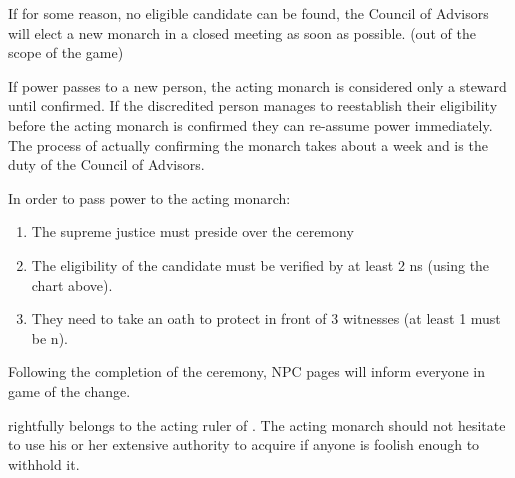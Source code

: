 \documentclass[white]{NeptuneBall}
\begin{document}
If for some reason, no eligible candidate can be  found, the Council of Advisors will elect a new monarch in a closed meeting as soon as possible. (out of the scope of the game)

If power passes to a new person, the acting monarch is considered only a steward until confirmed. If the discredited person manages to reestablish their eligibility before the acting monarch is confirmed they can re-assume power immediately. The process of actually confirming the monarch takes about a week and is the duty of the Council of Advisors.

In order to pass power to the acting monarch:
\begin{enumerate}
\item The supreme justice must preside over the ceremony
\item The eligibility of the candidate must be verified by at least 2 \pAtlantis{}ns (using the chart above).
\item They need to take an oath to protect \pAtlantis{} in front of 3 witnesses (at least 1 must be \pAtlantis{}n).
\end{enumerate}

Following the completion of the ceremony, NPC pages will inform everyone in game of the change.

\iTrident{} rightfully belongs to the acting ruler of \pAtlantis{}. The acting monarch should not hesitate to use his or her extensive authority to acquire  \iTrident{} if anyone is foolish enough to withhold it.
\end{document}
